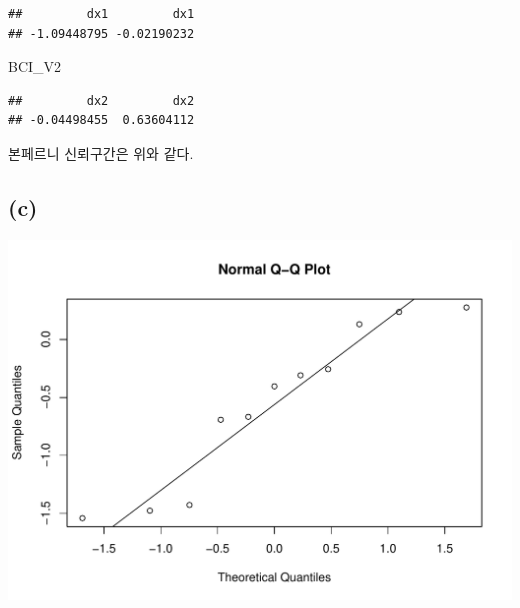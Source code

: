 \documentclass[
]{article}
\newenvironment{Shaded}{\begin{snugshade}}{\end{snugshade}}
\newcommand{\FunctionTok}[1]{\textcolor[rgb]{0.13,0.29,0.53}{\textbf{#1}}}
\newcommand{\NormalTok}[1]{#1}
\newcommand{\SpecialCharTok}[1]{\textcolor[rgb]{0.81,0.36,0.00}{\textbf{#1}}}
\begin{document}
\begin{verbatim}
##         dx1         dx1 
## -1.09448795 -0.02190232
\end{verbatim}

\begin{Shaded}
\begin{Highlighting}[]
\NormalTok{BCI\_V2}
\end{Highlighting}
\end{Shaded}

\begin{verbatim}
##         dx2         dx2 
## -0.04498455  0.63604112
\end{verbatim}

본페르니 신뢰구간은 위와 같다.

\subsection{(c)}\label{c}

\begin{Shaded}
\end{Shaded}

\begin{center}\includegraphics[width=0.8\linewidth]{multi_hw7_files/figure-latex/unnamed-chunk-17-1} \end{center}

\begin{Shaded}
\end{Shaded}
\end{document}
